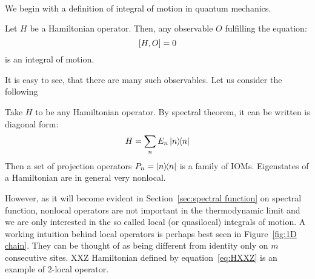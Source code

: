 \paragraph{}We begin with a definition of integral of motion in quantum mechanics.
\begin{definition}
  Let \(H\) be a Hamiltonian operator. Then, any observable \(O\) fulfilling the equation:
  \[
    \comm{H}{O} = 0
  \]
  is an integral of motion.\label{def:iom}
\end{definition}
It is easy to see, that there are many such observables. Let us consider the following
\begin{example}
  Take \(H\) to be any Hamiltonian operator. By spectral theorem, it can be written is diagonal form:
  \begin{equation*}
    H = \sum_n E_n \ketbra{n}{n}
  \end{equation*}
  Then a set of projection operators \(P_n = \ketbra{n}{n}\) is a family of IOMs.
  Eigenstates of a Hamiltonian are in general very nonlocal. \label{ex: projectors}
\end{example}
However, as it will become evident in Section~\ref{sec:spectral function} on spectral function, nonlocal operators are not important in the
thermodynamic limit and we are only interested in the so called local (or quasilocal) integrals of motion.
A working intuition behind local operators is perhaps best seen in Figure~\ref{fig:1D chain}. They can be thought of as
being different from identity only on \(m\) consecutive sites. XXZ Hamiltonian defined by equation~\eqref{eq:HXXZ} is an
example of 2-local operator.
